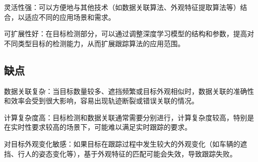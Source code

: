 灵活性强：可以方便地与其他技术（如数据关联算法、外观特征提取算法等）结合，以适应不同的应用场景和需求。

可扩展性好：在目标检测部分，可以通过调整深度学习模型的结构和参数，提高对不同类型目标的检测能力，从而扩展跟踪算法的应用范围\cite{tang2021multiple}。
\subsection{缺点}
数据关联复杂：当目标数量较多、遮挡频繁或目标外观相似时，数据关联的准确性和效率会受到很大影响，容易出现轨迹断裂或错误关联的情况。

计算复杂度高：目标检测和数据关联通常需要分别进行，计算复杂度较高，特别是在实时性要求较高的场景下，可能难以满足实时跟踪的要求。

对目标外观变化敏感：如果目标在跟踪过程中发生较大的外观变化（如车辆的遮挡、行人的姿态变化等），基于外观特征的匹配可能会失效，导致跟踪失败\cite{sun2020sparse}。
















